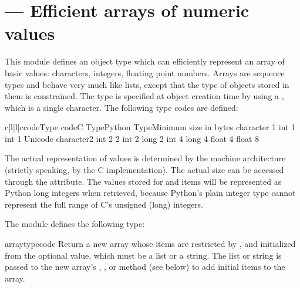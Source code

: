 \section{ ---
         Efficient arrays of numeric values}



This module defines an object type which can efficiently represent
an array of basic values: characters, integers, floating point
numbers.  Arrays are sequence types and behave very much
like lists, except that the type of objects stored in them is
constrained.  The type is specified at object creation time by using a
, which is a single character.  The following type
codes are defined:

\begin{tableiv}{c|l|l|c}{code}{Type code}{C Type}{Python Type}{Minimum size in bytes}
            {character}        {1}
     {int}              {1}
   {int}              {1}
      {Unicode character}{2}
    {int}              {2}
                {2}
      {int}              {2}
    {long}             {2}
     {int}              {4}
   {long}             {4}
           {float}            {4}
          {float}            {8}
\end{tableiv}

The actual representation of values is determined by the machine
architecture (strictly speaking, by the C implementation).  The actual
size can be accessed through the  attribute.  The values
stored  for  and  items will be represented as
Python long integers when retrieved, because Python's plain integer
type cannot represent the full range of C's unsigned (long) integers.


The module defines the following type:

\begin{funcdesc}{array}{typecode}
Return a new array whose items are restricted by ,
and initialized from the optional  value, which
must be a list or a string.  The list or string is passed to the
new array's , , or
 method (see below) to add initial items to
the array.
\end{funcdesc}

